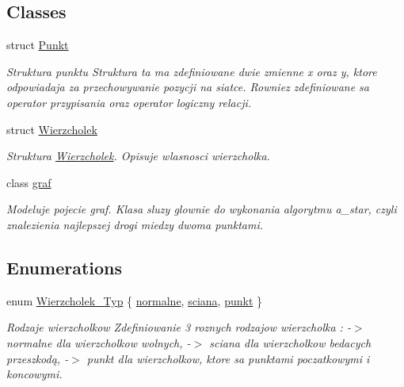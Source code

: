 \subsection*{Classes}
\begin{DoxyCompactItemize}
\item 
struct \hyperlink{struct_punkt}{Punkt}
\begin{DoxyCompactList}\small\item\em Struktura punktu Struktura ta ma zdefiniowane dwie zmienne x oraz y, ktore odpowiadaja za przechowywanie pozycji na siatce. Rowniez zdefiniowane sa operator przypisania oraz operator logiczny relacji. \end{DoxyCompactList}\item 
struct \hyperlink{struct_wierzcholek}{Wierzcholek}
\begin{DoxyCompactList}\small\item\em Struktura \hyperlink{struct_wierzcholek}{Wierzcholek}. Opisuje wlasnosci wierzcholka. \end{DoxyCompactList}\item 
class \hyperlink{classgraf}{graf}
\begin{DoxyCompactList}\small\item\em Modeluje pojecie graf. Klasa sluzy glownie do wykonania algorytmu a\-\_\-star, czyli znalezienia najlepszej drogi miedzy dwoma punktami. \end{DoxyCompactList}\end{DoxyCompactItemize}
\subsection*{Enumerations}
\begin{DoxyCompactItemize}
\item 
enum \hyperlink{graf_8hh_af54d448689b4613c3715929ca2a914a2}{Wierzcholek\-\_\-\-Typ} \{ \hyperlink{graf_8hh_af54d448689b4613c3715929ca2a914a2a846f623e19814cffb78d5ef92e77f7a3}{normalne}, 
\hyperlink{graf_8hh_af54d448689b4613c3715929ca2a914a2adb5535e159eca8e4dc5aafad57d8a4ba}{sciana}, 
\hyperlink{graf_8hh_af54d448689b4613c3715929ca2a914a2aeae5b57b7024c23312af9137b42aa6b1}{punkt}
 \}
\begin{DoxyCompactList}\small\item\em Rodzaje wierzcholkow Zdefiniowanie 3 roznych rodzajow wierzcholka \-: -\/$>$ normalne dla wierzcholkow wolnych, -\/$>$ sciana dla wierzcholkow bedacych przeszkodą, -\/$>$ punkt dla wierzcholkow, ktore sa punktami poczatkowymi i koncowymi. \end{DoxyCompactList}\end{DoxyCompactItemize}


